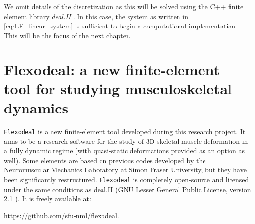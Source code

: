 \documentclass{sfuthesis}
\numberwithin{equation}{section}
\numberwithin{figure}{chapter}
\numberwithin{table}{chapter}
\theoremstyle{definition}
\begin{document}
We omit details of the discretization as this will be solved using the C++ finite element library \textit{deal.II} \cite{dealii}. In this case, the system as written in \eqref{eq:LF_linear_system} is sufficient to begin a computational implementation. This will be the focus of the next chapter.


\chapter{Flexodeal: a new finite-element tool for studying musculoskeletal dynamics} \label{ch:flexodeal}

\texttt{Flexodeal} is a new finite-element tool developed during this research project. It aims to be a research software for the study of 3D skeletal muscle deformation in a fully dynamic regime (with quasi-static deformations provided as an option as well). Some elements are based on previous codes developed by the Neuromuscular Mechanics Laboratory at Simon Fraser University, but they have been significantly restructured. \texttt{Flexodeal} is completely open-source and licensed under the same conditions as deal.II (GNU Lesser General Public License, version 2.1 \cite{dealii}). It is freely available at:
\begin{center}
    \url{https://github.com/sfu-nml/flexodeal}.
\end{center}
\end{document}
